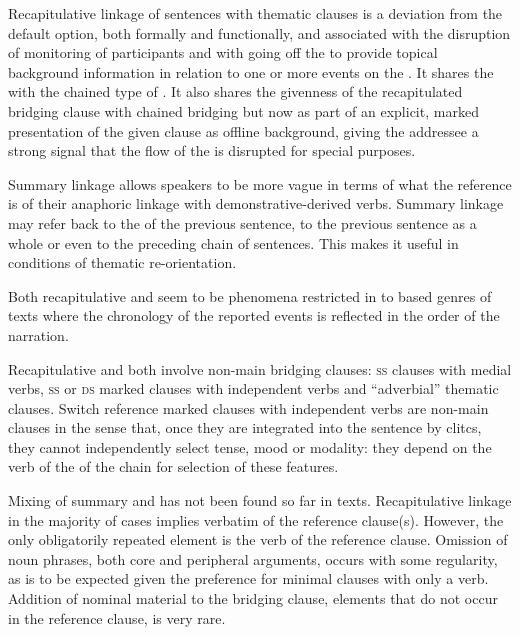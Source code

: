 \documentclass[output=paper]{LSP/langsci}
\begin{document}
Recapitulative linkage of sentences with thematic clauses is a deviation from the default option, both formally and functionally, and associated with the disruption of  monitoring of participants and with going off the  to provide topical background information in relation to one or more events on the . It shares the  with the chained type of . It also shares the givenness of the recapitulated bridging clause with chained bridging but now as part of an explicit, marked presentation of the given clause as offline background,  giving  the addressee a strong signal that the flow of the  is disrupted for special purposes.

Summary linkage allows speakers to be more vague in terms of what the reference is of their anaphoric linkage with demonstrative-derived verbs. Summary linkage may refer back to the  of the previous sentence, to the previous sentence as a whole or even to the preceding chain of sentences. This makes it useful in conditions of thematic re-orientation.

Both recapitulative and  seem to be phenomena restricted in  to  based genres of texts where the chronology of the reported events is reflected in the order of the narration. 

Recapitulative and  both involve non-main bridging clauses: \textsc{ss} clauses with medial verbs, \textsc{ss} or \textsc{ds} marked clauses with independent verbs and ``adverbial'' thematic clauses. Switch reference marked clauses with independent verbs are non-main clauses in the sense that, once they are integrated into the sentence by  clitcs, they cannot independently select tense, mood or modality: they depend on the verb of the  of the chain for selection of these features.

Mixing of summary and  has not been found so far in  texts. Recapitulative linkage in the majority of cases implies verbatim  of the reference clause(s). However, the only obligatorily repeated element is the verb of the reference clause. Omission of noun phrases, both core and peripheral arguments, occurs with some regularity, as is to be expected given the preference for minimal clauses with only a verb. Addition of nominal material to the bridging clause, elements that do not occur in the reference clause, is very rare.
\end{document}
